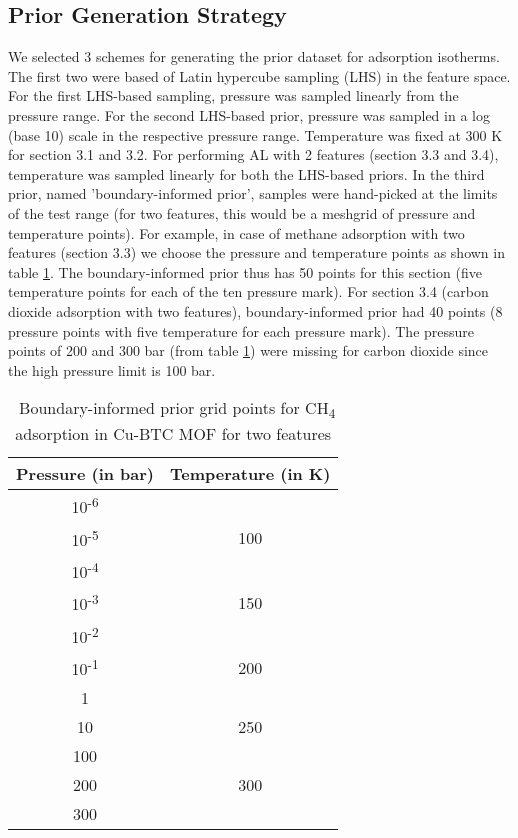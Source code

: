 \documentclass[twoside,twocolumn,9pt]{article}
\begin{document}
\subsection{Prior Generation Strategy}
We selected 3 schemes for generating the prior dataset for adsorption isotherms. The first two were based of Latin hypercube sampling (LHS) in the feature space.\cite{LHS} For the first LHS-based sampling, pressure was sampled linearly from the pressure range. For the second LHS-based prior, pressure was sampled in a log (base 10) scale in the respective pressure range. Temperature was fixed at 300 K for section 3.1 and 3.2. For performing AL with 2 features (section 3.3 and 3.4), temperature was sampled linearly for both the LHS-based priors. %
In the third prior, named 'boundary-informed prior', samples were hand-picked at the limits of the test range (for two features, this would be a meshgrid of pressure and temperature points). For example, in case of methane adsorption with two features (section 3.3) we choose the pressure and temperature points as shown in table \ref{tbl:Prior}. The boundary-informed prior thus has 50 points for this section (five temperature points for each of the ten pressure mark). For section 3.4 (carbon dioxide adsorption with two features), boundary-informed prior had 40 points (8 pressure points with five temperature for each pressure mark). The pressure points of 200 and 300 bar (from table \ref{tbl:Prior}) were missing for carbon dioxide since the high pressure limit is 100 bar.\\

\begin{table}[ht]
\small
  \caption{\ Boundary-informed prior grid points for CH\textsubscript{4} adsorption in Cu-BTC MOF for two features}
  \label{tbl:Prior}
  \begin{tabular*}{0.48\textwidth}{@{\extracolsep{\fill}}cc}
    \hline
    Pressure (in bar) & Temperature (in K)\\
    \hline
    10\textsuperscript{-6} \\
    10\textsuperscript{-5} & 100\\
    10\textsuperscript{-4} \\
    10\textsuperscript{-3} & 150\\
    10\textsuperscript{-2} \\
    10\textsuperscript{-1} & 200\\
    1 \\
    10 & 250\\
    100 \\
    200 & 300\\ 
    300 \\
    \hline
  \end{tabular*}
\end{table}
\end{document}
